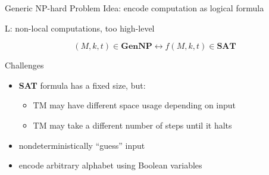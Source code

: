 \documentclass[11pt,usenames,dvipsnames,
hyperref={pdfencoding=auto,psdextra}]{beamer}
\newcommand*{\sat}{\textbf{SAT}}
\newcommand*{\gennp}{\textbf{GenNP}}
\begin{document}
\begin{frame}{Generic NP-hard Problem}
  Idea: encode computation as logical formula


  \begin{overlayarea}{\textwidth}{0.4\textwidth}
     {
      \vspace{3ex}
      \begin{center}
        L: non-local computations, too high-level \frownie{}
      \end{center}
    }

    \[ 
      (M, k, t) \in \gennp{} \leftrightarrow f(M, k, t) \in \sat{}
    \]
  \end{overlayarea}
\end{frame}

\begin{frame}{Challenges}
  \begin{itemize}
    \item \sat{} formula has a fixed size, but: 
      \begin{itemize} 
        \item TM may have different space usage depending on input
        \item TM may take a different number of steps until it halts
      \end{itemize}
    \item nondeterministically ``guess'' input
    \item encode arbitrary alphabet using Boolean variables
  \end{itemize}
\end{frame}
\end{document}
